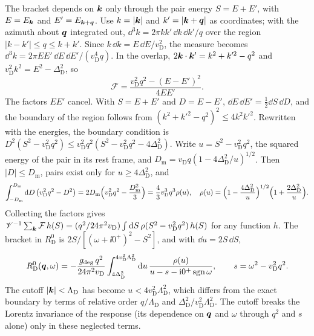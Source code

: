 The bracket depends on $\bm{k}$ only through the pair energy $S = E + E'$, with $E = E_{\bm{k}}$ and $E' = E_{\bm{k}+\bm{q}}$. Use $k = |\bm{k}|$ and $k' = |\bm{k}+\bm{q}|$ as coordinates; with the azimuth about $\bm{q}$ integrated out, $\dd^3k = 2\pi kk'\,\dd k\,\dd k'/q$ over the region $|k - k'| \le q \le k + k'$. Since $k\,\dd k = E\,\dd E/v_{\mathrm{D}}^2$, the measure becomes $\dd^3k = 2\pi EE'\,\dd E\,\dd E'/(v_{\mathrm{D}}^4q)$. In the overlap, $2\bm{k}\cdot\bm{k}' = k^2 + k'^2 - q^2$ and $v_{\mathrm{D}}^2k^2 = E^2 - \Delta_{\mathrm{D}}^2$, so
\begin{equation*}
  \mathcal{F} = \frac{v_{\mathrm{D}}^2q^2 - (E - E')^2}{4EE'} .
\end{equation*}
The factors $EE'$ cancel. With $S = E + E'$ and $D = E - E'$, $\dd E\,\dd E' = \frac12\dd S\,\dd D$, and the boundary of the region follows from $(k^2 + k'^2 - q^2)^2 \le 4k^2k'^2$. Rewritten with the energies, the boundary condition is $D^2(S^2 - v_{\mathrm{D}}^2q^2) \le v_{\mathrm{D}}^2q^2(S^2 - v_{\mathrm{D}}^2q^2 - 4\Delta_{\mathrm{D}}^2)$. Write $u = S^2 - v_{\mathrm{D}}^2q^2$, the squared energy of the pair in its rest frame, and $D_{\mathrm{m}} = v_{\mathrm{D}}q(1 - 4\Delta_{\mathrm{D}}^2/u)^{1/2}$. Then $|D| \le D_{\mathrm{m}}$, pairs exist only for $u \ge 4\Delta_{\mathrm{D}}^2$, and
\begin{equation*}
  \int_{-D_{\mathrm{m}}}^{D_{\mathrm{m}}}\mathrm{d} D\,\bigl(v_{\mathrm{D}}^2q^2 - D^2\bigr) = 2D_{\mathrm{m}}\Bigl(v_{\mathrm{D}}^2q^2 - \frac{D_{\mathrm{m}}^2}{3}\Bigr) = \frac43v_{\mathrm{D}}^3q^3\rho(u), \quad
  \rho(u) = \Bigl(1 - \frac{4\Delta_{\mathrm{D}}^2}{u}\Bigr)^{1/2}\Bigl(1 + \frac{2\Delta_{\mathrm{D}}^2}{u}\Bigr) .
\end{equation*}
Collecting the factors gives $\mathscr{V}^{-1}\sum_{\bm{k}}\mathcal{F}\,h(S) = (q^2/24\pi^2v_{\mathrm{D}})\int\mathrm{d} S\,\rho(S^2 - v_{\mathrm{D}}^2q^2)\,h(S)$ for any function $h$. The bracket in $R^0_{\mathrm{D}}$ is $2S/[(\omega + \ii0^+)^2 - S^2]$, and with $\dd u = 2S\,\dd S$,
\begin{equation}
  R^0_{\mathrm{D}}(\bm{q},\omega) = -\frac{g_{\mathrm{deg}}\,q^2}{24\pi^2v_{\mathrm{D}}}\int_{4\Delta_{\mathrm{D}}^2}^{4v_{\mathrm{D}}^2\Lambda_{\mathrm{D}}^2}\mathrm{d} u\,\frac{\rho(u)}{u - s - \mathrm{i}0^+\operatorname{sgn}\omega}, \qquad s = \omega^2 - v_{\mathrm{D}}^2q^2 .
  \label{eq:D.22-R}
\end{equation}
The cutoff $|\bm{k}| < \Lambda_{\mathrm{D}}$ has become $u < 4v_{\mathrm{D}}^2\Lambda_{\mathrm{D}}^2$, which differs from the exact boundary by terms of relative order $q/\Lambda_{\mathrm{D}}$ and $\Delta_{\mathrm{D}}^2/v_{\mathrm{D}}^2\Lambda_{\mathrm{D}}^2$. The cutoff breaks the Lorentz invariance of the response (its dependence on $\bm{q}$ and $\omega$ through $q^2$ and $s$ alone) only in these neglected terms.

